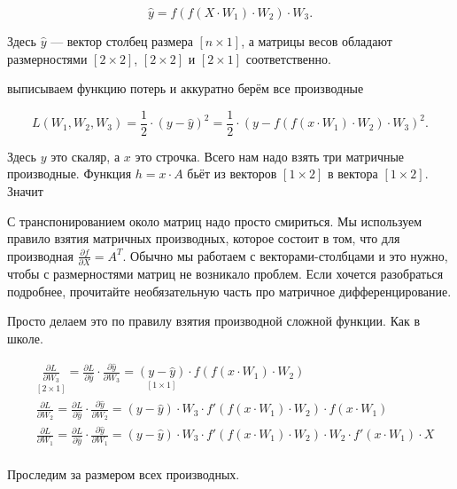\begin{sol}
\[
\hat{y} = f(f(X\cdot W_1) \cdot W_2) \cdot W_3.
\]

Здесь $\hat{y}$ --- вектор столбец размера $[n \times 1]$, а матрицы весов обладают размерностями $[2 \times 2]$, $[2 \times 2]$ и $[2 \times 1]$ соответственно. 
 
 выписываем функцию потерь и аккуратно берём все производные

\[
L(W_1, W_2, W_3) = \frac{1}{2} \cdot (y - \hat y)^2 = \frac{1}{2} \cdot (y - f(f(x \cdot W_1) \cdot W_2) \cdot W_3)^2.
\]




Здесь $y$ это скаляр, а $x$ это строчка. Всего нам надо взять три матричные производные. Функция $h = x \cdot A$  бьёт из векторов $[1 \times 2]$ в вектора $[1 \times 2]$. Значит 


С транспонированием около матриц надо просто смириться. Мы используем правило взятия матричных производных, которое состоит в том, что для  производная $\frac{\partial f}{\partial X} = A^T$. Обычно мы работаем с векторами-столбцами и это нужно, чтобы с размерностями матриц не возникало проблем. Если хочется разобраться подробнее, прочитайте необязательную часть про матричное дифференцирование. 




Просто делаем это по правилу взятия производной сложной функции. Как в школе. 

\begin{equation*}
    \begin{aligned} 
    & \underset{[2 \times 1] }{\frac{\partial L}{\partial W_3}} =  \frac{\partial L}{\partial \hat y} \cdot \frac{\partial \hat y}{\partial W_3} =  \underset{[1 \times 1] }{(y - \hat{y})}  \cdot f(f(x\cdot W_1) \cdot W_2) \\
    & \frac{\partial L}{\partial W_2} =  \frac{\partial L}{\partial \hat y} \cdot \frac{\partial \hat y}{\partial W_2} =  (y - \hat{y}) \cdot  W_3 \cdot f'(f(x\cdot W_1) \cdot W_2) \cdot f(x\cdot W_1) \\
    & \frac{\partial L}{\partial W_1} = \frac{\partial L}{\partial \hat y} \cdot \frac{\partial \hat y}{\partial W_1} =  (y - \hat{y})  \cdot  W_3 \cdot f'(f(x\cdot W_1) \cdot W_2) \cdot W_2 \cdot  f'(x\cdot W_1) \cdot X \\
    \end{aligned} 
\end{equation*}

Проследим за размером всех производных.


\end{sol}
